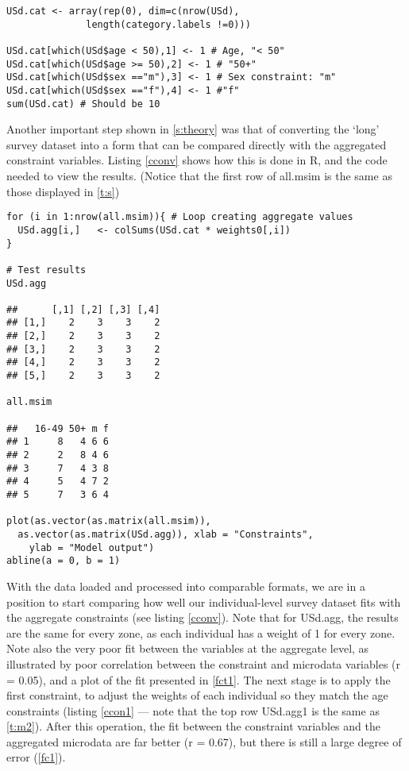\documentclass[a4paper,10pt]{article}
\begin{document}
\begin{lstlisting}[float = h, caption={R code to convert the survey
dataset into binary form}, label=ccat]
USd.cat <- array(rep(0), dim=c(nrow(USd),
			  length(category.labels !=0)))

USd.cat[which(USd$age < 50),1] <- 1 # Age, "< 50"
USd.cat[which(USd$age >= 50),2] <- 1 # "50+"
USd.cat[which(USd$sex =="m"),3] <- 1 # Sex constraint: "m"
USd.cat[which(USd$sex =="f"),4] <- 1 #"f"
sum(USd.cat) # Should be 10
\end{lstlisting}

Another important step shown in \cref{s:theory} was that of converting the
`long' survey dataset into a form that can be compared directly with the
aggregated constraint variables. Listing \ref{cconv} shows how this is done
in R, and the code needed to view the results. (Notice that the first row
of all.msim is the same as those displayed in \cref{t:s})

\begin{lstlisting}[float=h, caption={R code to aggregate the survey dataset},
label=cconv]
 for (i in 1:nrow(all.msim)){ # Loop creating aggregate values
  USd.agg[i,]   <- colSums(USd.cat * weights0[,i])
}

# Test results
USd.agg

##      [,1] [,2] [,3] [,4]
## [1,]    2    3    3    2
## [2,]    2    3    3    2
## [3,]    2    3    3    2
## [4,]    2    3    3    2
## [5,]    2    3    3    2

all.msim

##   16-49 50+ m f
## 1     8   4 6 6
## 2     2   8 4 6
## 3     7   4 3 8
## 4     5   4 7 2
## 5     7   3 6 4

plot(as.vector(as.matrix(all.msim)),
  as.vector(as.matrix(USd.agg)), xlab = "Constraints",
    ylab = "Model output")
abline(a = 0, b = 1)
\end{lstlisting}

With the data loaded and processed into comparable formats, we are in a
position to start comparing how well our individual-level survey dataset
fits with the aggregate constraints (see listing \ref{cconv}). Note that for
USd.agg,
the results are the same for every zone, as each individual has a weight of 1
for every zone. Note also the very poor fit between the variables at the
aggregate level, as illustrated by poor correlation between the constraint and
microdata variables (r = 0.05), and a plot of the fit presented in \cref{fct1}.
The next stage is to apply the first constraint,
to adjust the weights of each individual so they match the age constraints
(listing \ref{ccon1} --- note that the top row USd.agg1 is the same as
\cref{t:m2}). After this operation, the fit between the constraint
variables and the aggregated microdata are far better (r = 0.67), but there
is still a large degree of error (\cref{fc1}).
\end{document}
